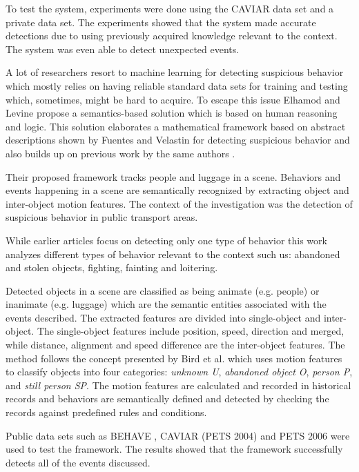 To test the system, experiments were done using the CAVIAR data set \cite{n19} and a private data set. The experiments showed that the system made accurate detections due to using previously acquired knowledge relevant to the context. The system was even able to detect unexpected events.

A lot of researchers resort to machine learning for detecting suspicious behavior which mostly relies on having reliable standard data sets for training and testing which, sometimes, might be hard to acquire. To escape this issue Elhamod and Levine \cite{n2} propose a semantics-based solution which is based on human reasoning and logic. This solution elaborates a mathematical framework based on abstract descriptions shown by Fuentes and Velastin \cite{n3} for detecting suspicious behavior and also builds up on previous work by the same authors \cite{n4}.

Their proposed framework tracks people and luggage in a scene. Behaviors and events happening in a scene are semantically recognized by extracting object and inter-object motion features. The context of the investigation was the detection of suspicious behavior in public transport areas.

While earlier articles focus on detecting only one type of behavior \cite{n5,n6} this work analyzes different types of behavior relevant to the context such us: abandoned and stolen objects, fighting, fainting and loitering.

Detected objects in a scene are classified as being animate (e.g. people) or inanimate (e.g. luggage) which are the semantic entities associated with the events described. The extracted features are divided into single-object and inter-object. The single-object features include position, speed, direction and merged, while distance, alignment and speed difference are the inter-object features. The method follows the concept presented by Bird et al. \cite{n6} which uses motion features to classify objects into four categories: \textit{unknown U}, \textit{abandoned object O}, \textit{person P}, and \textit{still person SP}. The motion features are calculated and recorded in historical records and behaviors are semantically defined and detected by checking the records against predefined rules and conditions.

Public data sets such as BEHAVE \cite{n20}, CAVIAR (PETS 2004) \cite{n21} and PETS 2006 \cite{n22} were used to test the framework. The results showed that the framework successfully detects all of the events discussed.

